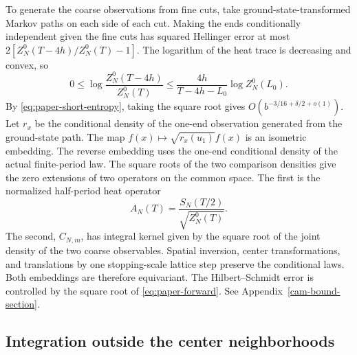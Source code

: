 \documentclass[11pt,a4paper]{article}
\numberwithin{equation}{section}
\begin{document}
To generate the coarse observations from fine cuts, take ground-state-transformed Markov paths on each side of each cut. Making the ends conditionally independent given the fine cuts has squared Hellinger error at most \(2[Z_N^0(T-4h)/Z_N^0(T)-1]\). The logarithm of the heat trace is decreasing and convex, so
\begin{equation}
 0\le \log\frac{Z_N^0(T-4h)}{Z_N^0(T)}
   \le \frac{4h}{T-4h-L_0}\log Z_N^0(L_0).
 \label{eq:paper-forward}
\end{equation}
By \eqref{eq:paper-short-entropy}, taking the square root gives \(O(b^{-3/16+\delta/2+o(1)})\). Let \(r_x\) be the conditional density of the one-end observation generated from the ground-state path. The map \(f(x)\mapsto\sqrt{r_x(u_1)}f(x)\) is an isometric embedding. The reverse embedding uses the one-end conditional density of the actual finite-period law. The square roots of the two comparison densities give the zero extensions of two operators on the common space. The first is the normalized half-period heat operator
\[
 A_N(T)=\frac{S_N(T/2)}{\sqrt{Z_N^0(T)}}.
\]
The second, \(C_{N,m}\), has integral kernel given by the square root of the joint density of the two coarse observables. Spatial inversion, center transformations, and translations by one stopping-scale lattice step preserve the conditional laws. Both embeddings are therefore equivariant. The Hilbert--Schmidt error is controlled by the square root of \eqref{eq:paper-forward}. See Appendix~\ref{cam-bound-section}.

\subsection{Integration outside the center neighborhoods}
\end{document}
